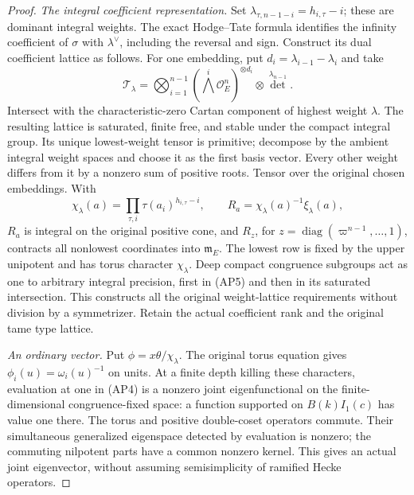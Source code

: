 \begin{proof}
\emph{The integral coefficient representation.}
Set \(\lambda_{\tau,n-1-i}=h_{i,\tau}-i\); these are dominant
integral weights.  The exact Hodge--Tate formula
\cite[Theorem~2.1.1]{SelmerPTBLGGT} identifies the infinity coefficient
of \(\sigma\) with \(\lambda^\vee\), including the reversal and sign.
Construct its dual coefficient lattice as follows.  For one embedding,
put \(d_i=\lambda_{i-1}-\lambda_i\) and take
\[
 \mathcal T_\lambda=
 \bigotimes_{i=1}^{n-1}(\bigwedge^i\mathcal O_E^n)^{\otimes d_i}
                          \otimes\det^{\lambda_{n-1}}.
                                                        \tag{AP5}
\]
Intersect with the characteristic-zero Cartan component of highest
weight \(\lambda\).  The resulting lattice is saturated, finite free,
and stable under the compact integral group.  Its unique lowest-weight
tensor is primitive; decompose by the ambient integral weight spaces
and choose it as the first basis vector.  Every other weight differs
from it by a nonzero sum of positive roots.  Tensor over the original
chosen embeddings.  With
\[
 \chi_\lambda(a)=\prod_{\tau,i}\tau(a_i)^{h_{i,\tau}-i},
 \qquad R_a=\chi_\lambda(a)^{-1}\xi_\lambda(a),            \tag{AP6}
\]
\(R_a\) is integral on the original positive cone, and
\(R_z\), for \(z=\operatorname{diag}(\varpi^{n-1},\ldots,1)\),
contracts all nonlowest coordinates into \(\mathfrak m_E\).
The lowest row is fixed by the upper unipotent and has torus
character \(\chi_\lambda\).  Deep compact congruence subgroups act
as one to arbitrary integral precision, first in \textup{(AP5)} and
then in its saturated intersection.  This constructs all the original
weight-lattice requirements without division by a symmetrizer.  Retain
the actual coefficient rank and the original tame type lattice.

\emph{An ordinary vector.}
Put \(\phi=x\theta/\chi_\lambda\).  The original torus equation gives
\(\phi_i(u)=\omega_i(u)^{-1}\) on units.  At a finite depth killing
these characters, evaluation at one in \textup{(AP4)} is a nonzero joint
eigenfunctional on the finite-dimensional congruence-fixed space:
a function supported on \(B(k)I_1(c)\) has value one there.
The torus and positive double-coset operators commute.  Their simultaneous
generalized eigenspace detected by evaluation is nonzero; the commuting
nilpotent parts have a common nonzero kernel.  This gives an actual
joint eigenvector, without assuming semisimplicity of ramified Hecke
operators.


\end{proof}
